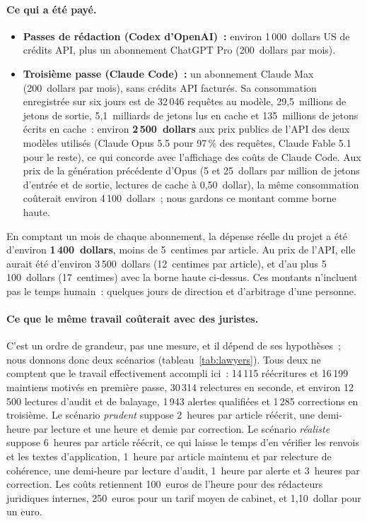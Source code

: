 \documentclass[11pt,a4paper]{article}
\begin{document}
\paragraph{Ce qui a été payé.}
\begin{itemize}
  \item \textbf{Passes de rédaction (Codex d'OpenAI)~:} environ 1\,000~dollars US de crédits API, plus un abonnement ChatGPT Pro (200~dollars par mois).
  \item \textbf{Troisième passe (Claude Code)~:} un abonnement Claude Max (200~dollars par mois), sans crédits API facturés. Sa consommation enregistrée sur six jours est de 32\,046 requêtes au modèle, 29,5~millions de jetons de sortie, 5,1~milliards de jetons lus en cache et 135~millions de jetons écrits en cache~: environ \textbf{2\,500~dollars} aux prix publics de l'API des deux modèles utilisés (Claude Opus 5.5 pour 97\,\% des requêtes, Claude Fable 5.1 pour le reste), ce qui concorde avec l'affichage des coûts de Claude Code. Aux prix de la génération précédente d'Opus (5 et 25~dollars par million de jetons d'entrée et de sortie, lectures de cache à 0,50~dollar), la même consommation coûterait environ 4\,100~dollars~; nous gardons ce montant comme borne haute.
\end{itemize}
En comptant un mois de chaque abonnement, la dépense réelle du projet a été d'environ \textbf{1\,400~dollars}, moins de 5~centimes par article. Au prix de l'API, elle aurait été d'environ 3\,500~dollars (12~centimes par article), et d'au plus 5\,100~dollars (17~centimes) avec la borne haute ci-dessus. Ces montants n'incluent pas le temps humain~: quelques jours de direction et d'arbitrage d'une personne.

\paragraph{Ce que le même travail coûterait avec des juristes.}
C'est un ordre de grandeur, pas une mesure, et il dépend de ses hypothèses~; nous donnons donc deux scénarios (tableau~\ref{tab:lawyers}). Tous deux ne comptent que le travail effectivement accompli ici~: 14\,115 réécritures et 16\,199 maintiens motivés en première passe, 30\,314 relectures en seconde, et environ 12\,500 lectures d'audit et de balayage, 1\,943 alertes qualifiées et 1\,285 corrections en troisième. Le scénario \emph{prudent} suppose 2~heures par article réécrit, une demi-heure par lecture et une heure et demie par correction. Le scénario \emph{réaliste} suppose 6~heures par article réécrit, ce qui laisse le temps d'en vérifier les renvois et les textes d'application, 1~heure par article maintenu et par relecture de cohérence, une demi-heure par lecture d'audit, 1~heure par alerte et 3~heures par correction. Les coûts retiennent 100~euros de l'heure pour des rédacteurs juridiques internes, 250~euros pour un tarif moyen de cabinet, et 1,10~dollar pour un euro.
\end{document}
